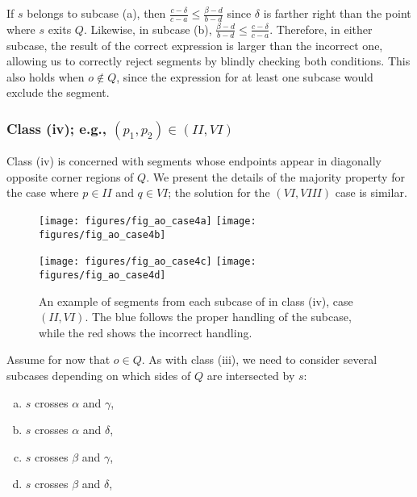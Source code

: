 If $s$ belongs to subcase (a), then $\frac{c - \delta}{c - a} \leq \frac{\beta - d}{b - d}$ since $\delta$ is farther right than the point where $s$ exits $Q$. Likewise, in subcase (b), $\frac{\beta - d}{b - d} \leq \frac{c - \delta}{c - a}$.  Therefore, in either subcase, the result of the correct expression is larger than the incorrect one, allowing us to correctly reject segments by blindly checking both conditions.  This also holds when $o \not \in Q$, since the expression for at least one subcase would exclude the segment.


\subsubsection*{Class (iv); e.g., $(p_1, p_2) \in (II, VI)$}
\label{:rectanges:ao:class4}

Class (iv) is concerned with segments whose endpoints appear in diagonally opposite corner regions of $Q$. We present the details of the majority property for the case where $p \in II$ and $q \in VI$; the solution for the $(VI, VIII)$ case is similar.

\begin{figure}[t]
\begin{center}
  \texttt{[image: figures/fig\_ao\_case4a]}
  \hspace{1.0em}
  \texttt{[image: figures/fig\_ao\_case4b]}

  \vspace{2.0em}
  
  \texttt{[image: figures/fig\_ao\_case4c]}
  \hspace{1.0em}
  \texttt{[image: figures/fig\_ao\_case4d]}

  \caption[An example of a segment in class (iv), case $(II, VI)$.]{An example of segments from each subcase of in class (iv), case $(II, VI)$. The blue follows the proper handling of the subcase, while the red shows the incorrect handling.}
  \label{fig:rectangles:ao:case4}
\end{center}
\end{figure}

Assume for now that $o \in Q$. As with class (iii), we need to consider several subcases depending on which sides of $Q$ are intersected by $s$:

\begin{enumerate}[(a)]
\item $s$ crosses $\alpha$ and $\gamma$,
\item $s$ crosses $\alpha$ and $\delta$,
\item $s$ crosses $\beta$ and $\gamma$,
\item $s$ crosses $\beta$ and $\delta$,
\end{enumerate}

